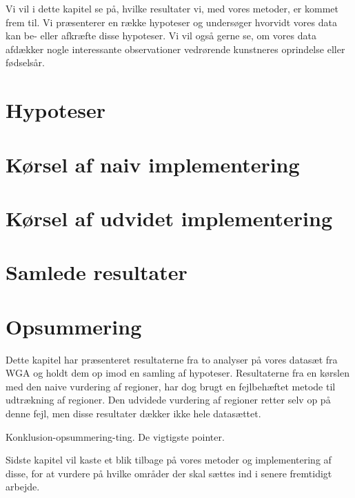 {
{\sffamily Vi vil i dette kapitel se på, hvilke resultater vi, med vores
metoder, er kommet frem til. Vi præsenterer en række hypoteser og
undersøger hvorvidt vores data kan be- eller afkræfte disse hypoteser.
Vi vil også gerne se, om vores data afdækker nogle interessante
observationer vedrørende kunstneres oprindelse eller fødselsår.
}

\section{Hypoteser}


\section{Kørsel af naiv implementering\label{section_naiv_koersel}}

\clearpage

\section{Kørsel af udvidet implementering\label{section_udvidet_koersel}}


\section{Samlede resultater\label{section_samlede_resultater}}


\section*{Opsummering}
Dette kapitel har præsenteret resultaterne fra to analyser på vores
datasæt fra WGA og holdt dem op imod en samling af hypoteser.
Resultaterne fra en kørslen med den naive vurdering af regioner, har dog
brugt en fejlbehæftet metode til udtrækning af regioner.  Den udvidede
vurdering af regioner retter selv op på denne fejl, men disse resultater
dækker ikke hele datasættet.

Konklusion-opsummering-ting. De vigtigste pointer.

Sidste kapitel vil kaste et blik tilbage på vores metoder og
implementering af disse, for at vurdere på hvilke områder der skal
sættes ind i senere fremtidigt arbejde.

}

